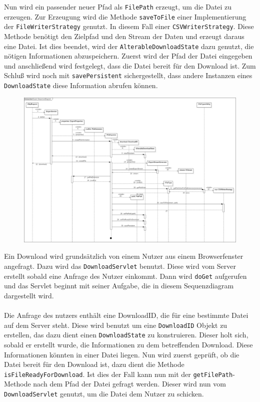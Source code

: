 Nun wird ein passender neuer Pfad als \texttt{FilePath} erzeugt, um die Datei zu erzeugen. Zur Erzeugung wird die Methode \texttt{saveToFile} einer Implementierung der \texttt{FileWriterStrategy} genutzt. In diesem Fall einer \texttt{CSVWriterStrategy}. Diese Methode benötigt den Zielpfad und den Stream der Daten und erzeugt daraus eine Datei. Ist dies beendet, wird der \texttt{AlterableDownloadState} dazu genutzt, die nötigen Informationen abzuspeichern. Zuerst wird der Pfad der Datei eingegeben und anschließend wird festgelegt, dass die Datei bereit für den Download ist. Zum Schluß wird noch mit \texttt{savePersistent} sichergestellt, dass andere Instanzen eines \texttt{DownloadState} diese Information abrufen können.
\begin{figure}[!hbp]
	\centering
	\includegraphics[width=\linewidth]{images/export/ExportSequenceDiagram.png}
\end{figure}
\newpage
Ein Download wird grundsätzlich von einem Nutzer aus einem Browserfenster angefragt. Dazu wird das \texttt{DownloadServlet} benutzt. Diese wird vom Server erstellt sobald eine Anfrage des Nutzer einkommt. Dann wird \texttt{doGet} aufgerufen und das Servlet beginnt mit seiner Aufgabe, die in diesem Sequenzdiagram dargestellt wird.\\\\
Die Anfrage des nutzers enthält eine DownloadID, die für eine bestimmte Datei auf dem Server steht. Diese wird benutzt um eine \texttt{DownloadID} Objekt zu erstellen, das dazu dient einen \texttt{DownloadState} zu konstruieren. Dieser holt sich, sobald er erstellt wurde, die Informationen zu dem betreffenden Download. Diese Informationen könnten in einer Datei liegen. Nun wird zuerst geprüft, ob die Datei bereit für den Download ist, dazu dient die Methode \texttt{isFileReadyForDownload}. Ist dies der Fall kann nun mit der \texttt{getFilePath}-Methode nach dem Pfad der Datei gefragt werden. Dieser wird nun vom \texttt{DownloadServlet} genutzt, um die Datei dem Nutzer zu schicken.\\\\
